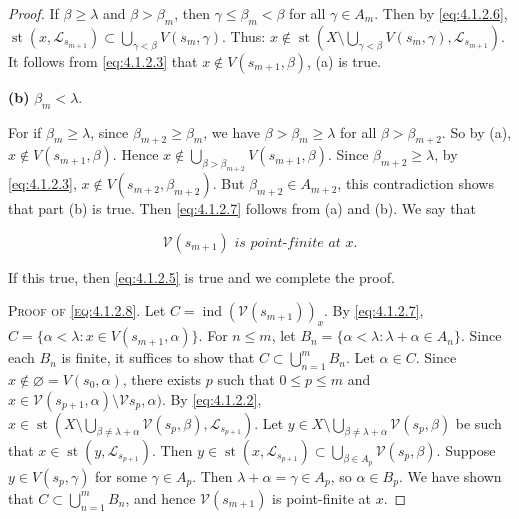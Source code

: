 \documentclass[main.tex]{subfiles}
\begin{document}
\begin{proof}
\noindent If $\beta \ge \lambda$ and $\beta > \beta_m$, then  $\gamma \le \beta_m < \beta$ 
for all $ \gamma\in A_m$. 
Then by \eqref{eq:4.1.2.6}, 
$\operatorname{st}(x, \mathscr{L}_{s_{m+1}}) \subset \bigcup_{\gamma < \beta} V(s_m, \gamma)$. 
Thus: $x \notin \operatorname{st}
\left(X \setminus \bigcup_{\gamma < \beta} V(s_m, \gamma), \mathscr{L}_{s_{m+1}}\right)$.
It follows from \eqref{eq:4.1.2.3} that $x\notin V(s_{m+1}, \beta)$, (a) is true.

\textbf{(b)}  $\beta_m < \lambda$.

\noindent For if $\beta_m \ge \lambda$, 
since $\beta_{m+2} \ge \beta_m$, we have $\beta > \beta_m \ge \lambda$ for all $\beta > \beta_{m+2}$.
So by (a), $x\notin V(s_{m+1}, \beta)$. 
Hence $x\notin \bigcup_{\beta> \beta_{m+2}}V(s_{m+1}, \beta)$.
Since $\beta_{m+2} \ge \lambda$, by \eqref{eq:4.1.2.3},
$x\notin V(s_{m+2}, \beta_{m+2})$. But $\beta_{m+2} \in A_{m+2}$,
this contradiction shows that part (b) is true.
Then \eqref{eq:4.1.2.7} follows from (a) and (b). We say that

\begin{equation}
	\mathscr{V}(s_{m+1}) \textit{ is point-finite at } x. \label{eq:4.1.2.8}
\end{equation}

If this true, then \eqref{eq:4.1.2.5} is true and we complete the proof. 

\noindent\textsc{Proof of \eqref{eq:4.1.2.8}}. 
Let $C= \operatorname{ind}(\mathscr{V}(s_{m+1}))_x$. By \eqref{eq:4.1.2.7}, $C = \{\alpha < \lambda: x \in V(s_{m+1}, \alpha)\}$. For $n\le m$, let $B_n = \{\alpha < \lambda: \lambda + \alpha\in A_n\}$. Since each
$B_n $ is finite, it suffices to show that $C \subset \bigcup_{n=1}^{m} B_n$. 
Let $\alpha \in C$. Since $x\notin \varnothing = V(s_0, \alpha)$, there exists $p$ such that 
$0 \le p \le m$ and $x \in \mathscr{V}({s_{p+1}}, \alpha)\setminus  \mathscr{V}{s_{p}}, \alpha)$.
By \eqref{eq:4.1.2.2}, 
$x \in \operatorname{st}(X \setminus \bigcup_{\beta \ne \lambda + \alpha}\mathscr{V}(s_p, \beta),
	 \mathscr{L}_{s_{p+1}})$.
Let $y \in X\setminus
\bigcup_{\beta\ne \lambda + \alpha}\mathscr{V}(s_p, \beta)$
be such that $x \in \operatorname{st}(y, \mathscr{L}_{s_{p+1}})$. Then
 $y \in \operatorname{st}(x, \mathscr{L}_{s_{p+1}})\subset\bigcup_{\beta\in A_p}\mathscr{V}(s_p, \beta)$.
 Suppose $y \in V(s_p, \gamma)$ for some $\gamma\in A_p$.
 Then $\lambda + \alpha= \gamma \in A_p$, so $\alpha \in B_p$.
We have shown that $C \subset \bigcup_{n=1}^{m} B_n$, and hence 
$\mathscr{V}(s_{m+1})$ is point-finite at $x$.
\end{proof}
\end{document}
